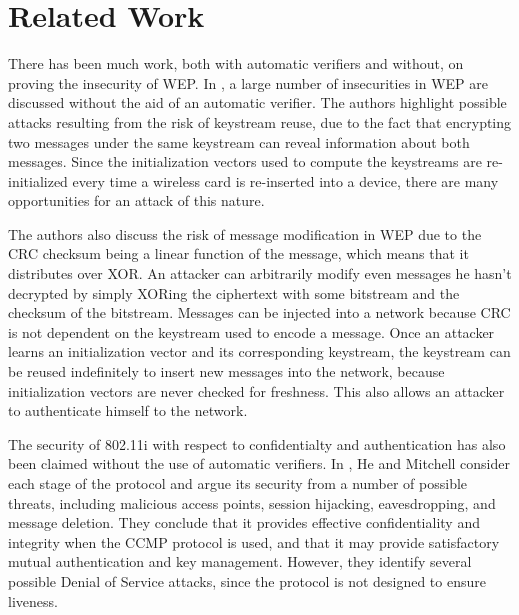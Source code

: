 \documentclass[11pt, twocolumn]{article} %
\begin{document}
\section{Related Work}
\label{sec:Related Work}
There has been much work, both with automatic verifiers and without, on proving the insecurity of WEP.  In \cite{borisov01}, a large number of insecurities in WEP are discussed without the aid of an automatic verifier.  The authors highlight possible attacks resulting from the risk of keystream reuse, due to the fact that encrypting two messages under the same keystream can reveal information about both messages.  Since the initialization vectors used to compute the keystreams are re-initialized every time a wireless card is re-inserted into a device, there are many opportunities for an attack of this nature.  

The authors also discuss the risk of message modification in WEP due to the CRC checksum being a linear function of the message, which means that it distributes over XOR.  An attacker can arbitrarily modify even messages he hasn't decrypted by simply XORing the ciphertext with some bitstream and the checksum of the bitstream.  Messages can be injected into a network because CRC is not dependent on the keystream used to encode a message. Once an attacker learns an initialization vector and its corresponding keystream, the keystream can be reused indefinitely to insert new messages into the network, because initialization vectors are never checked for freshness.  This also allows an attacker to authenticate himself to the network.  

The security of 802.11i with respect to confidentialty and authentication has also been claimed without the use of automatic verifiers.  In \cite{he05}, He and Mitchell consider each stage of the protocol and argue its security from a number of possible threats, including malicious access points, session hijacking, eavesdropping, and message deletion.  They conclude that it provides effective confidentiality and integrity when the CCMP protocol is used, and that it may provide satisfactory mutual authentication and key management.  However, they identify several possible Denial of Service attacks, since the protocol is not designed to ensure liveness.
\end{document}
